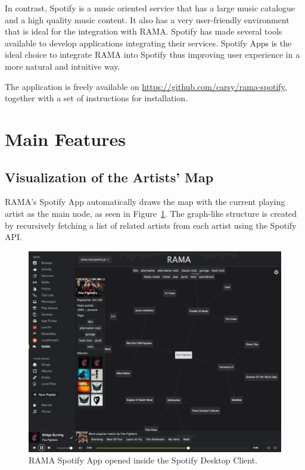 \documentclass{article}
\begin{document}
    In contrast, Spotify is a music oriented service that has a large music catalogue and a high quality music content.
    It also has a very user-friendly environment that is ideal for the integration with RAMA.
    Spotify has made several tools available to develop applications\cite{spotifydev} integrating their services.
    Spotify Apps is the ideal choice to integrate RAMA into Spotify thus improving user experience in a more natural and intuitive way.

    The application is freely available on \url{https://github.com/carsy/rama-spotify}, together with a 
    set of instructions for installation.

\vspace{-0.2cm}
  \section{Main Features}
  \label{sec:features}

    \subsection{Visualization of the Artists' Map}
    \label{sub:visualization}

      RAMA's Spotify App automatically draws the map with the current playing artist as the main node, as seen in Figure~\ref{fig:spotify_app}.
      The graph-like structure is created by recursively fetching a list of related artists from each artist using the Spotify API\cite{spotifyapiartists}.
      \begin{figure}[hb]
        \begin{center}
          \includegraphics[width=\columnwidth]{../report/figures/graph_rootnode.pdf}
        \end{center}
        \caption{RAMA Spotify App opened inside the Spotify Desktop Client.}
        \label{fig:spotify_app}
      \end{figure}
\end{document}
